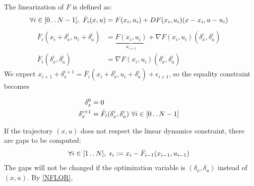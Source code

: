 \documentclass{report}
\newcommand{\twodots}{\mathinner {\ldotp \ldotp}}
\begin{document}
\medskip
The linearization of $F$ is defined as:
\[
\forall i \in [0 \twodots N-1] , \ \bar{F}_i(x, u) = F(x_i, u_i) + DF(x_i, u_i)(x - x_i, u -u_i)
\]
\begin{equation}
\begin{split}
\bar{F}_i(x_i + \delta_x^i, u_i + \delta_u^i) &=  \underbrace{F(x_i, u_i)}_{x_{i+1}} + \nabla F(x_i, u_i) (\delta_x^i, \delta_u^i) \\
\bar{F}_i(\delta_x^i, \delta_u^i) &=  \nabla F(x_i, u_i) (\delta_x^i, \delta_u^i)
\end{split}
\end{equation}
We expect $x_{i+1} + \delta_x^{i+1} = \bar{F}_i (x_i + \delta_x^i, u_i + \delta_u^i) + \epsilon_{i+1}$,
so the equality constraint becomes 
\begin{tcolorbox}
\begin{equation}
\begin{aligned}
\delta_x^0 &= 0
\\
\delta_x^{i+1} &= \bar{F}_i(\delta_x^i, \delta_u^i) 
 \ \forall i \in [0 \twodots N-1] 
\end{aligned}
\end{equation}
\end{tcolorbox}
If the trajectory $(x, u)$ does not respect the linear dynamics constraint, there are gaps to be computed:
\begin{equation}
\forall i \in [1 \twodots N], \ \epsilon_i := x_i - \bar{F}_{i-1}(x_{i-1}, u_{i-1})
\end{equation}
The gaps will not be changed if the optimization variable is $(\delta_x, \delta_u)$ instead of $(x,u)$. By \ref{NFLQR}, 
\end{document}
